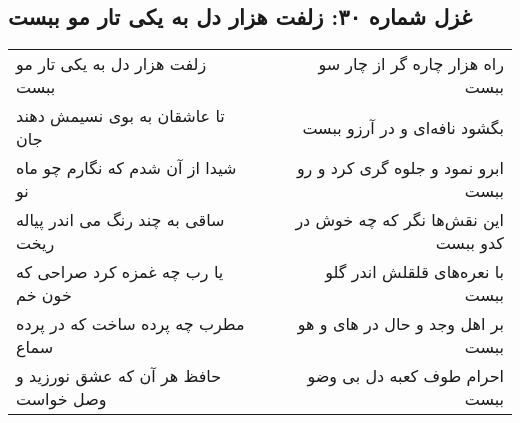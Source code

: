 \begin{center}
\section*{غزل شماره ۳۰: زلفت هزار دل به یکی تار مو ببست}
\label{sec:sh030}
\begin{longtable}{l p{0.5cm} r}
زلفت هزار دل به یکی تار مو ببست
&&
راه هزار چاره گر از چار سو ببست
\\
تا عاشقان به بوی نسیمش دهند جان
&&
بگشود نافه‌ای و در آرزو ببست
\\
شیدا از آن شدم که نگارم چو ماه نو
&&
ابرو نمود و جلوه گری کرد و رو ببست
\\
ساقی به چند رنگ می اندر پیاله ریخت
&&
این نقش‌ها نگر که چه خوش در کدو ببست
\\
یا رب چه غمزه کرد صراحی که خون خم
&&
با نعره‌های قلقلش اندر گلو ببست
\\
مطرب چه پرده ساخت که در پرده سماع
&&
بر اهل وجد و حال در های و هو ببست
\\
حافظ هر آن که عشق نورزید و وصل خواست
&&
احرام طوف کعبه دل بی وضو ببست
\\
\end{longtable}
\end{center}
